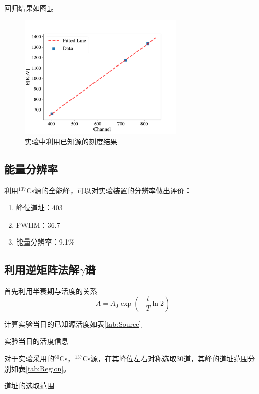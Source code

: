 \documentclass{article}
\begin{document}
    回归结果如图\ref{fig:Calibration}。
    \begin{figure}[htbp]
        \centering
        \includegraphics[width=0.7\textwidth]{../plots/Calibration.pdf}
        \caption{实验中利用已知源的刻度结果\label{fig:Calibration}}
    \end{figure}
    \subsection{能量分辨率}
    利用$^{137}\text{Cs}$源的全能峰，可以对实验装置的分辨率做出评价：
    \begin{enumerate}
        \item 峰位道址：403
        \item FWHM：36.7
        \item 能量分辨率：9.1\%
    \end{enumerate}
    \subsection{利用逆矩阵法解$\gamma$谱}
    首先利用半衰期与活度的关系\begin{equation}
        A = A_0\exp(-\frac{t}{T}\ln{2})
    \end{equation}
    
    计算实验当日的已知源活度如表\ref{tab:Source}
    \begin{table}[htbp]
        \centering
        \caption{实验当日的活度信息\label{tab:Source}}
        
    \end{table}

    对于实验采用的$^{60}\text{Cs}$，$^{137}\text{Cs}$源，在其峰位左右对称选取30道，其峰的道址范围分别如表\ref{tab:Region}。
    \begin{table}[htbp]
        \centering
        \caption{道址的选取范围\label{tab:Region}}
        
    \end{table}
\end{document}
